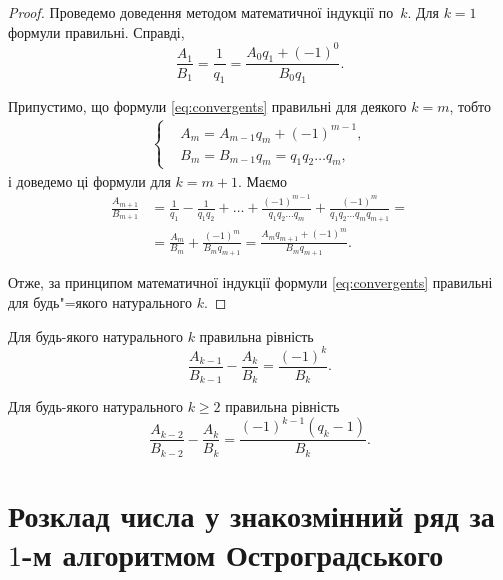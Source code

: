 \begin{proof}
Проведемо доведення методом математичної індукції по~$k$. Для
$k=1$ формули правильні. Справді,
\[
\frac{A_1}{B_1}=\frac{1}{q_1}=\frac{A_0q_1+(-1)^0}{B_0q_1}.
\]

Припустимо, що формули \eqref{eq:convergents} правильні для
деякого $k=m$, тобто
\begin{align*}
\left\{
\begin{aligned}
&A_m=A_{m-1}q_m+(-1)^{m-1},\\
&B_m=B_{m-1}q_m=q_1q_2\ldots q_m,
\end{aligned}
\right.
\end{align*}
і доведемо ці формули для $k=m+1$. Маємо
\begin{align*}
\frac{A_{m+1}}{B_{m+1}}&=\frac{1}{q_1}-\frac{1}{q_1 q_2}+\dots
+\frac{(-1)^{m-1}}{q_1q_2\dots q_m}+\frac{(-1)^m}{q_1q_2\dots
q_mq_{m + 1}}=\\ &=\frac{A_m}{B_m}+\frac{(-1)^m}{B_mq_{m + 1}} =
\frac{A_mq_{m+1}+(-1)^m}{B_mq_{m + 1}}.
\end{align*}

Отже, за принципом математичної індукції формули
\eqref{eq:convergents} правильні для будь"=якого натурального $k$.
\end{proof}

\begin{lemma}
Для будь-якого натурального $k$ правильна рівність
\begin{equation}\label{eq:convergents1}
\frac{A_{k-1}}{B_{k-1}}-\frac{A_k}{B_k}=\frac{(-1)^k}{B_k}.
\end{equation}
\end{lemma}

\begin{lemma}
Для будь-якого натурального $k\geq2$ правильна рівність
\begin{equation}\label{eq:convergents2}
\frac{A_{k-2}}{B_{k-2}}-\frac{A_k}{B_k}=\frac{(-1)^{k-1}(q_k-1)}{B_k}.
\end{equation}
\end{lemma}


\section{Розклад числа у знакозмінний ряд за $1$-м алгоритмом Остроградського}

